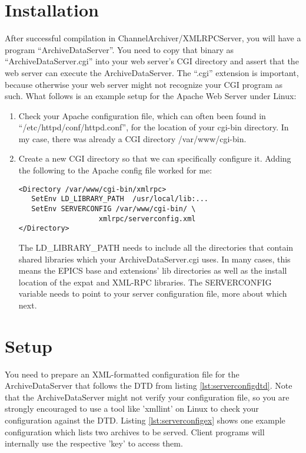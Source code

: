 \section{Installation} %
After successful compilation in ChannelArchiver/XMLRPCServer, you will
have a program ``ArchiveDataServer''. You need to copy that binary as
``ArchiveDataServer.cgi'' into your web server's CGI directory and
assert that the web server can execute the ArchiveDataServer.
The ``.cgi'' extension is important, because otherwise your web server
might not recognize your CGI program as such.
What follows is an example setup for the Apache Web Server under Linux:
\begin{enumerate}
\item Check your Apache configuration file, which can often been found
  in ``/etc/httpd/conf/httpd.conf'', for the location of your cgi-bin
  directory.  In my case, there was already a CGI directory /var/www/cgi-bin.

\item Create a new CGI directory so that we can specifically configure
  it. Adding the following to the Apache config file worked for me:
\begin{lstlisting}[keywordstyle=\sffamily]
<Directory /var/www/cgi-bin/xmlrpc>
   SetEnv LD_LIBRARY_PATH  /usr/local/lib:...
   SetEnv SERVERCONFIG /var/www/cgi-bin/ \
                   xmlrpc/serverconfig.xml
</Directory>
\end{lstlisting}
  The LD\_LIBRARY\_PATH needs to include all the directories that
  contain shared libraries which your ArchiveDataServer.cgi uses.
  In many cases, this means the EPICS base and extensions' lib
  directories as well as the install location of the expat and XML-RPC
  libraries.
  The SERVERCONFIG variable needs to point to your server configuration
   file, more about which next.
\end{enumerate}

\section{Setup}
You need to prepare an XML-formatted configuration file for the
ArchiveDataServer that follows the DTD from listing
\ref{lst:serverconfigdtd}. Note that the ArchiveDataServer might not
verify your configuration file, so you are strongly encouraged to use a
tool like 'xmllint' on Linux to check your configuration against the
DTD. Listing \ref{lst:serverconfigex} shows one example
configuration which lists two archives to be served. Client programs
will internally use the respective 'key' to access them.



